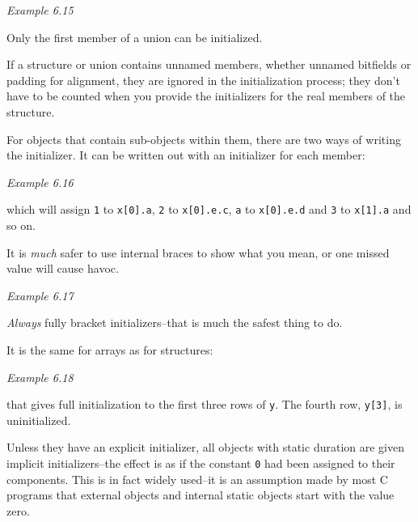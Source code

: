    \begin{center}\textit{Example 6.15}\end{center}


   Only the first member of a union can be initialized.


   If a structure or union contains unnamed members, whether unnamed
    bitfields or padding for alignment, they are ignored in the initialization
    process; they don't have to be counted when you provide the initializers
    for the real members of the structure.


   For objects that contain sub-objects within them, there are two ways of
    writing the initializer. It can be written out with an initializer for each
    member:


   \begin{center}\textit{Example 6.16}\end{center}


   which will assign \texttt{1} to \texttt{x[0].a}, \texttt{2}
    to \texttt{x[0].e.c}, \texttt{a} to \texttt{x[0].e.d} and
    \texttt{3} to \texttt{x[1].a} and so on.


   It is \textit{much} safer to use internal braces to show what you mean,
    or one missed value will cause havoc.


   \begin{center}\textit{Example 6.17}\end{center}


   \textit{Always} fully bracket initializers--that is much the safest
    thing to do.


   It is the same for arrays as for structures:


   \begin{center}\textit{Example 6.18}\end{center}


   that gives full initialization to the first three rows of \texttt{y}.
    The fourth row, \texttt{y[3]}, is uninitialized.


   Unless they have an explicit initializer, all objects with static
    duration are given implicit initializers--the effect is as if the
    constant \texttt{0} had been assigned to their components. This is in
    fact widely used--it is an assumption made by most C programs that
    external objects and internal static objects start with the value zero.


